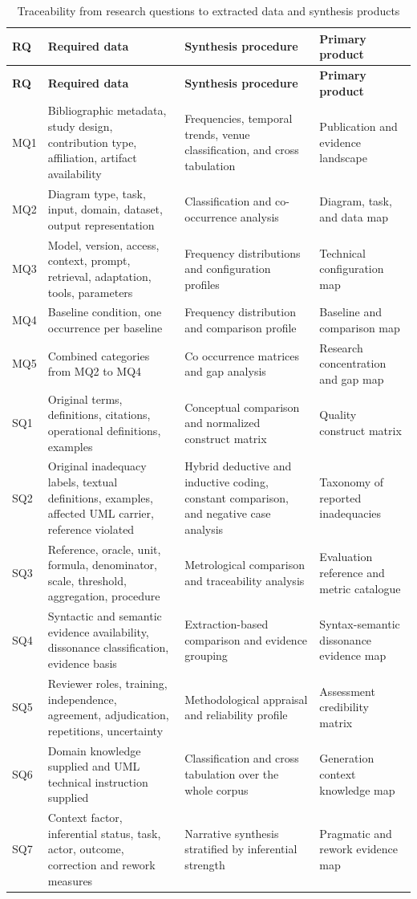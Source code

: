\begin{longtable}{@{}p{} p{} p{} p{}@{}}
\caption{Traceability from research questions to extracted data and synthesis products}
\label{tab:protocol_rq_traceability}\\
\toprule
\textbf{RQ} & \textbf{Required data} & \textbf{Synthesis procedure} & \textbf{Primary product} \\
\midrule
\endfirsthead
\toprule
\textbf{RQ} & \textbf{Required data} & \textbf{Synthesis procedure} & \textbf{Primary product} \\
\midrule
\endhead
MQ1 & Bibliographic metadata, study design, contribution type, affiliation, artifact availability & Frequencies, temporal trends, venue classification, and cross tabulation & Publication and evidence landscape \\
MQ2 & Diagram type, task, input, domain, dataset, output representation & Classification and co-occurrence analysis & Diagram, task, and data map \\
MQ3 & Model, version, access, context, prompt, retrieval, adaptation, tools, parameters & Frequency distributions and configuration profiles & Technical configuration map \\
MQ4 & Baseline condition, one occurrence per baseline & Frequency distribution and comparison profile & Baseline and comparison map \\
MQ5 & Combined categories from MQ2 to MQ4 & Co occurrence matrices and gap analysis & Research concentration and gap map \\
SQ1 & Original terms, definitions, citations, operational definitions, examples & Conceptual comparison and normalized construct matrix & Quality construct matrix \\
SQ2 & Original inadequacy labels, textual definitions, examples, affected UML carrier, reference violated & Hybrid deductive and inductive coding, constant comparison, and negative case analysis & Taxonomy of reported inadequacies \\
SQ3 & Reference, oracle, unit, formula, denominator, scale, threshold, aggregation, procedure & Metrological comparison and traceability analysis & Evaluation reference and metric catalogue \\
SQ4 & Syntactic and semantic evidence availability, dissonance classification, evidence basis & Extraction-based comparison and evidence grouping & Syntax-semantic dissonance evidence map \\
SQ5 & Reviewer roles, training, independence, agreement, adjudication, repetitions, uncertainty & Methodological appraisal and reliability profile & Assessment credibility matrix \\
SQ6 & Domain knowledge supplied and UML technical instruction supplied & Classification and cross tabulation over the whole corpus & Generation context knowledge map \\
SQ7 & Context factor, inferential status, task, actor, outcome, correction and rework measures & Narrative synthesis stratified by inferential strength & Pragmatic and rework evidence map \\
\bottomrule
\end{longtable}

